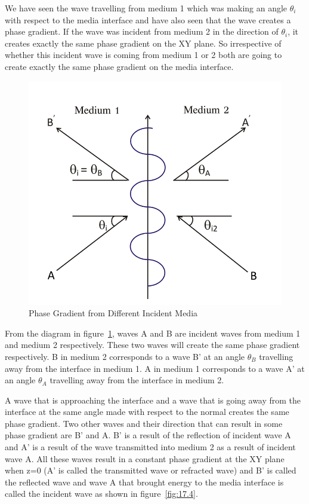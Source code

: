 We have seen the wave travelling from medium 1  which was making an angle $\theta_i$ with respect to the media interface and have also seen that the wave creates a phase gradient. If the wave was incident from medium 2 in the direction of $\theta_i$, it creates exactly the same phase gradient on the XY plane. So irrespective of whether this incident wave is coming from medium 1 or 2 both are going to create exactly the same phase gradient on the media interface.
\begin{figure}[h]
\centering
\includegraphics[width=.7\linewidth]{graphics/incident_and_reflected_waves}
\caption{Phase Gradient from Different Incident Media}
\label{fig:group30d---copy}
\end{figure}

From the diagram in figure~\ref{fig:group30d---copy}, waves A and B are incident waves from medium 1 and medium 2 respectively. These two waves will create the same phase gradient respectively. B in medium 2 corresponds to a wave B'  at an angle $\theta_B$ travelling away from the interface in medium 1. A in medium 1 corresponds to a wave A' at an angle $\theta_A$ travelling away from the interface in medium 2.

A wave that is approaching the interface and a wave that is going away from the interface at the same angle made with respect to the normal creates the same phase gradient. Two other waves and their direction that can result in some phase gradient are B'
and A. B' is a result of the reflection of incident wave A and A' is a result of the wave transmitted into medium 2 as a result of incident wave A. All these waves result in a constant phase gradient at the XY plane when z=0 (A' is called the transmitted wave or refracted wave) and B' is called the reflected wave and wave A that brought energy to the media interface is called the incident wave as shown in figure~\ref{fig:17.4}.

